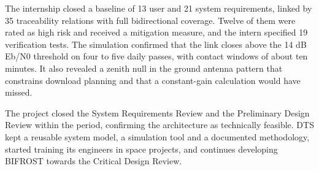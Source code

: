 The internship closed a baseline of 13 user and 21 system requirements, linked
by 35 traceability relations with full bidirectional coverage. Twelve of them
were rated as high risk and received a mitigation measure, and the intern
specified 19 verification tests. The
simulation confirmed that the link closes above the 14 dB Eb/N0 threshold on
four to five daily passes, with contact windows of about ten minutes. It also
revealed a zenith null in the ground antenna pattern that constrains download
planning and that a constant-gain calculation would have missed.

The project closed the System Requirements Review and the Preliminary Design
Review within the period, confirming the architecture as technically feasible. DTS kept a reusable system model, a simulation tool and a
documented methodology, started training its engineers in space projects, and
continues developing BIFROST towards the Critical Design Review.

\newpage
